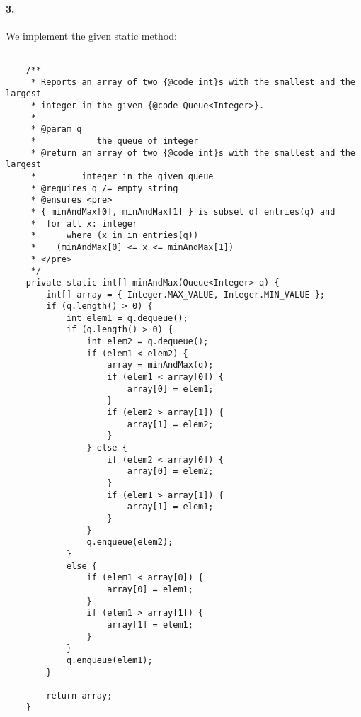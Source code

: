 \documentclass[10pt]{article}
\begin{document}
\paragraph{3. } We implement the given static method: 
\begin{lstlisting} 

    /**
     * Reports an array of two {@code int}s with the smallest and the largest
     * integer in the given {@code Queue<Integer>}.
     *
     * @param q
     *            the queue of integer
     * @return an array of two {@code int}s with the smallest and the largest
     *         integer in the given queue
     * @requires q /= empty_string
     * @ensures <pre>
     * { minAndMax[0], minAndMax[1] } is subset of entries(q) and
     *  for all x: integer
     *      where (x in in entries(q))
     *    (minAndMax[0] <= x <= minAndMax[1])
     * </pre>
     */
    private static int[] minAndMax(Queue<Integer> q) {
        int[] array = { Integer.MAX_VALUE, Integer.MIN_VALUE };
        if (q.length() > 0) {
            int elem1 = q.dequeue();
            if (q.length() > 0) {
                int elem2 = q.dequeue();
                if (elem1 < elem2) {
                    array = minAndMax(q);
                    if (elem1 < array[0]) {
                        array[0] = elem1;
                    }
                    if (elem2 > array[1]) {
                        array[1] = elem2;
                    }
                } else {
                    if (elem2 < array[0]) {
                        array[0] = elem2;
                    }
                    if (elem1 > array[1]) {
                        array[1] = elem1;
                    }
                }
                q.enqueue(elem2);
            }
            else {
                if (elem1 < array[0]) {
                    array[0] = elem1;
                }
                if (elem1 > array[1]) {
                    array[1] = elem1;
                }
            }
            q.enqueue(elem1);
        }

        return array;
    }
\end{lstlisting}
\end{document}
